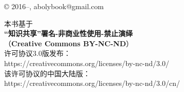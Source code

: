 \thispagestyle{empty}

\begin{center}
© 2016--\the\year, abolybook@gmail.com
\medskip

本书基于\\
\textbf{“知识共享”署名-非商业性使用-禁止演绎}\\
（\textbf{Creative Commons BY-NC-ND}）\\
许可协议3.0版发布：\\
https://creativecommons.org/licenses/by-nc-nd/3.0/\\
该许可协议的中国大陆版：\\
https://creativecommons.org/licenses/by-nc-nd/3.0/cn/
\end{center}
